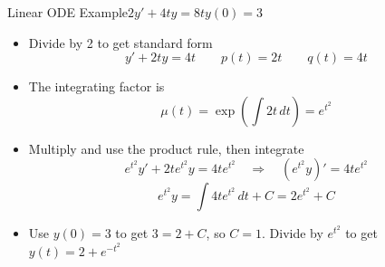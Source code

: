 \begin{frame}{Linear ODE Example\quad $2y'+4ty=8t$\quad $y(0)=3$}
\begin{itemize}
  \item Divide by 2 to get standard form
  \[
    y'+2ty=4t\qquad p(t)=2t\qquad q(t)=4t
  \]
  \item The integrating factor is
  \[
    \mu(t)=\exp\left(\int2t\,dt\right)=e^{t^2}
  \]
  \item Multiply and use the product rule, then integrate
  \[
    e^{t^2}y'+2te^{t^2}y=4te^{t^2}
    \quad\Longrightarrow\quad
    (e^{t^2}y)'=4te^{t^2}
  \]
  \[
    e^{t^2}y=\int4te^{t^2}\,dt+C=2e^{t^2}+C
  \]
  \item Use $y(0)=3$ to get $3=2+C$, so $C=1$. Divide by $e^{t^2}$ to get $\boxed{y(t)=2+e^{-t^2}}$
\end{itemize}
\end{frame}
